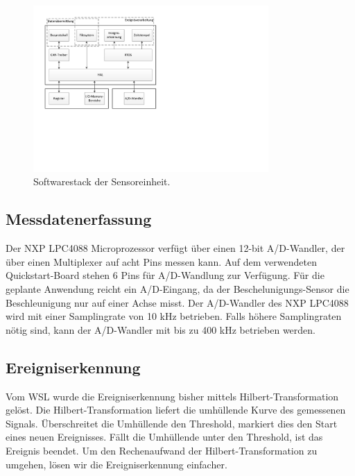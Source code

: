 \begin{figure}[H]
	\centering
		\includegraphics[width=0.8\textwidth]{images/visio/Softwarestack_Sensor.pdf}
	\caption{Softwarestack der Sensoreinheit.}
	\label{fig.sw_sensor}
\end{figure}



\subsection{Messdatenerfassung}\label{subsec.sw_messen}
Der NXP LPC4088 Microprozessor verfügt über einen 12-bit A/D-Wandler, der über einen Multiplexer auf acht Pins messen kann. Auf dem verwendeten Quickstart-Board stehen 6 Pins für A/D-Wandlung zur Verfügung. Für die geplante Anwendung reicht ein A/D-Eingang, da der Beschelunigungs-Sensor die Beschleunigung nur auf einer Achse misst. Der A/D-Wandler des NXP LPC4088 wird mit einer Samplingrate von 10 kHz betrieben. Falls höhere Samplingraten nötig sind, kann der A/D-Wandler mit bis zu 400 kHz betrieben werden.



\subsection{Ereigniserkennung}\label{subsec.sw_ereignis}
Vom WSL wurde die Ereigniserkennung bisher mittels Hilbert-Transformation gelöst. Die Hilbert-Transformation liefert die umhüllende Kurve des gemessenen Signals. Überschreitet die Umhüllende den Threshold, markiert dies den Start eines neuen Ereignisses. Fällt die Umhüllende unter den Threshold, ist das Ereignis beendet. Um den Rechenaufwand der Hilbert-Transformation zu umgehen, lösen wir die Ereigniserkennung einfacher.

